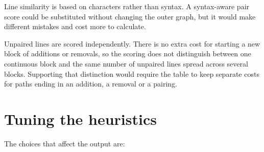 \documentclass[
]{article}
\begin{document}
Line similarity is based on characters rather than syntax. A
syntax-aware pair score could be substituted without changing the outer
graph, but it would make different mistakes and cost more to calculate.

Unpaired lines are scored independently. There is no extra cost for
starting a new block of additions or removals, so the scoring does not
distinguish between one continuous block and the same number of unpaired
lines spread across several blocks. Supporting that distinction would
require the table to keep separate costs for paths ending in an
addition, a removal or a pairing.

\hypertarget{tuning-the-heuristics}{%
\section{Tuning the heuristics}\label{tuning-the-heuristics}}

The choices that affect the output are:
\end{document}
